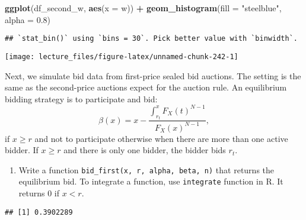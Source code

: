\documentclass[
]{book}
\newenvironment{Shaded}{\begin{snugshade}}{\end{snugshade}}
\newcommand{\CommentTok}[1]{\textcolor[rgb]{0.56,0.35,0.01}{\textit{#1}}}
\newcommand{\DataTypeTok}[1]{\textcolor[rgb]{0.13,0.29,0.53}{#1}}
\newcommand{\DecValTok}[1]{\textcolor[rgb]{0.00,0.00,0.81}{#1}}
\newcommand{\FloatTok}[1]{\textcolor[rgb]{0.00,0.00,0.81}{#1}}
\newcommand{\KeywordTok}[1]{\textcolor[rgb]{0.13,0.29,0.53}{\textbf{#1}}}
\newcommand{\NormalTok}[1]{#1}
\newcommand{\OperatorTok}[1]{\textcolor[rgb]{0.81,0.36,0.00}{\textbf{#1}}}
\newcommand{\StringTok}[1]{\textcolor[rgb]{0.31,0.60,0.02}{#1}}
\providecommand{\tightlist}{%
  \setlength{\itemsep}{0pt}\setlength{\parskip}{0pt}}
\begin{document}
\begin{Shaded}
\begin{Highlighting}[]
\KeywordTok{ggplot}\NormalTok{(df_second_w, }\KeywordTok{aes}\NormalTok{(}\DataTypeTok{x =}\NormalTok{ w)) }\OperatorTok{+}\StringTok{ }\KeywordTok{geom_histogram}\NormalTok{(}\DataTypeTok{fill =} \StringTok{"steelblue"}\NormalTok{, }\DataTypeTok{alpha =} \FloatTok{0.8}\NormalTok{)}
\end{Highlighting}
\end{Shaded}

\begin{verbatim}
## `stat_bin()` using `bins = 30`. Pick better value with `binwidth`.
\end{verbatim}

\begin{center}\texttt{[image: lecture\_files/figure-latex/unnamed-chunk-242-1]} \end{center}

Next, we simulate bid data from first-price sealed bid auctions. The setting is the same as the second-price auctions expect for the auction rule. An equilibrium bidding strategy is to participate and bid:
\[
\beta(x) = x - \frac{\int_{r_t}^x F_X(t)^{N - 1}}{F_X(x)^{N - 1}},
\]
if \(x \ge r\) and not to participate otherwise when there are more than one active bidder. If \(x \ge r\) and there is only one bidder, the bidder bids \(r_t\).

\begin{enumerate}
\def\labelenumi{\arabic{enumi}.}
\setcounter{enumi}{3}
\tightlist
\item
  Write a function \texttt{bid\_first(x,\ r,\ alpha,\ beta,\ n)} that returns the equilibrium bid. To integrate a function, use \texttt{integrate} function in R. It returns 0 if \(x < r\).
\end{enumerate}

\begin{Shaded}
\end{Shaded}

\begin{verbatim}
## [1] 0.3902289
\end{verbatim}
\end{document}
